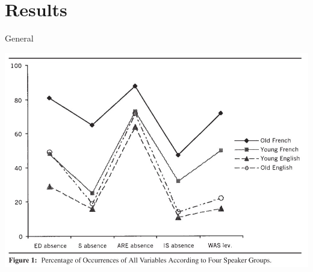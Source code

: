 \documentclass{beamer}
\begin{document}
  \section{Results}
    \begin{frame}{General}
      \begin{center}
        \includegraphics[scale=0.5]{general_results.jpg}
      \end{center}
    \end{frame}

\end{document}

